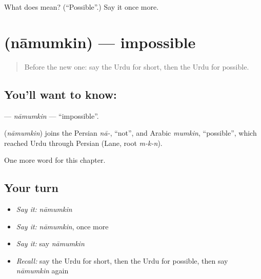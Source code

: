 \begin{tcolorbox}[breakable,colback=teal!4,colframe=teal!35!black,title={Before you move on}]
What does  mean? (\textquotedblleft{}Possible\textquotedblright{}.) Say it once more.
\end{tcolorbox}
\section[\texorpdfstring{\ur{ناممکن} (nāmumkin)}{ناممکن (nāmumkin)}]{ (nāmumkin) — impossible}

\label{lesson:UR-C247-namumkin}



\begin{quote}
Before the new one: say the Urdu for short, then the Urdu for possible.
\end{quote}

\subsection*{You'll want to know: }
\textbf{} — \emph{nāmumkin} — \textquotedblleft{}impossible\textquotedblright{}.

\begin{cousinweb}
\textbf{} (\emph{nāmumkin}) joins the Persian \emph{nā-}, \textquotedblleft{}not\textquotedblright{}, and Arabic \emph{mumkin}, \textquotedblleft{}possible\textquotedblright{}, which reached Urdu through Persian (Lane, root \emph{m-k-n}).
\end{cousinweb}

\begin{grammarlens}[title={What you've built}]
One more word for this chapter.
\end{grammarlens}

\subsection*{Your turn}
\begin{itemize}
\raggedright
  \item \emph{Say it:} \emph{nāmumkin}
  \item \emph{Say it:} \emph{nāmumkin}, once more
  \item \emph{Say it:} say \emph{nāmumkin}
  \item \emph{Recall:} say the Urdu for short, then the Urdu for possible, then say \emph{nāmumkin} again
\end{itemize}

